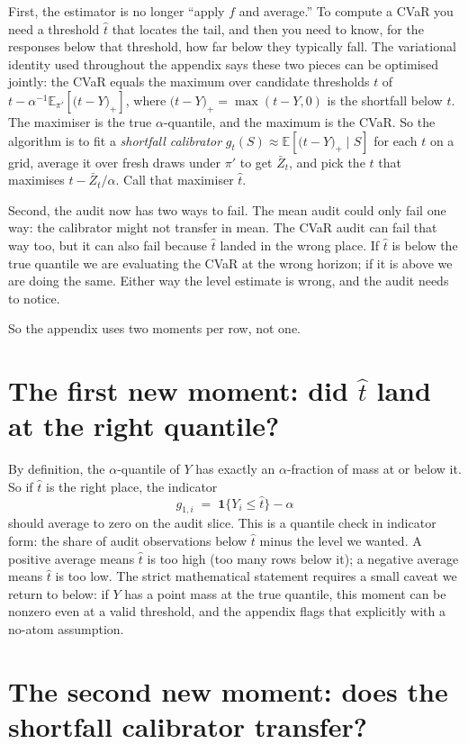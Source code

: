 \documentclass[11pt]{article}
\newcommand{\E}{\mathbb{E}}
\newcommand{\one}{\mathbf{1}}
\newcommand{\pprime}{\pi'}
\newcommand{\sloss}[2]{\bigl(#1 - #2\bigr)_{+}}
\newcommand{\that}{\hat t}
\begin{document}
First, the estimator is no longer ``apply $f$ and average.'' To compute a CVaR you need a threshold $\that$ that locates the tail, and then you need to know, for the responses below that threshold, how far below they typically fall. The variational identity used throughout the appendix says these two pieces can be optimised jointly: the CVaR equals the maximum over candidate thresholds $t$ of $t - \alpha^{-1} \E_{\pprime}\!\left[\sloss{t}{Y}\right]$, where $\sloss{t}{Y} = \max(t - Y, 0)$ is the shortfall below $t$. The maximiser is the true $\alpha$-quantile, and the maximum is the CVaR. So the algorithm is to fit a \emph{shortfall calibrator} $g_t(S) \approx \E\!\left[\sloss{t}{Y} \mid S\right]$ for each $t$ on a grid, average it over fresh draws under $\pprime$ to get $\bar Z_t$, and pick the $t$ that maximises $t - \bar Z_t / \alpha$. Call that maximiser $\that$.

Second, the audit now has two ways to fail. The mean audit could only fail one way: the calibrator might not transfer in mean. The CVaR audit can fail that way too, but it can also fail because $\that$ landed in the wrong place. If $\that$ is below the true quantile we are evaluating the CVaR at the wrong horizon; if it is above we are doing the same. Either way the level estimate is wrong, and the audit needs to notice.

So the appendix uses two moments per row, not one.

\section*{The first new moment: did $\that$ land at the right quantile?}

By definition, the $\alpha$-quantile of $Y$ has exactly an $\alpha$-fraction of mass at or below it. So if $\that$ is the right place, the indicator
\[
g_{1,i} \;=\; \one\{Y_i \le \that\} - \alpha
\]
should average to zero on the audit slice. This is a quantile check in indicator form: the share of audit observations below $\that$ minus the level we wanted. A positive average means $\that$ is too high (too many rows below it); a negative average means $\that$ is too low. The strict mathematical statement requires a small caveat we return to below: if $Y$ has a point mass at the true quantile, this moment can be nonzero even at a valid threshold, and the appendix flags that explicitly with a no-atom assumption.

\section*{The second new moment: does the shortfall calibrator transfer?}
\end{document}
